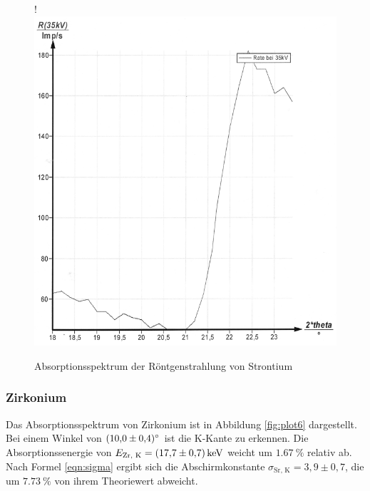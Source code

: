 \begin{figure}[H]!
  \centering
  \includegraphics[scale=0.3]{content/bild5.png}
  \caption{Absorptionsspektrum der Röntgenstrahlung von Strontium}
  \label{fig:plot5}
\end{figure}

\subsubsection{Zirkonium}

Das Absorptionsspektrum von Zirkonium ist in Abbildung \ref{fig:plot6} dargestellt.
Bei einem Winkel von $\SI{10.0 +- 0.4}{\degree}$ ist die K-Kante zu erkennen. Die
Absorptionssenergie von $E_\text{Zr, K} = \SI{17.7 +- 0.7}{\kilo\eV}$ weicht
um $\SI{1.67}{\percent}$ relativ ab. Nach Formel \eqref{eqn:sigma} ergibt 
sich die Abschirmkonstante $\sigma_\text{Sr, K} = 3,9 \pm 0,7$, die um 
$\SI{7.73}{\percent}$ von ihrem Theoriewert abweicht.

